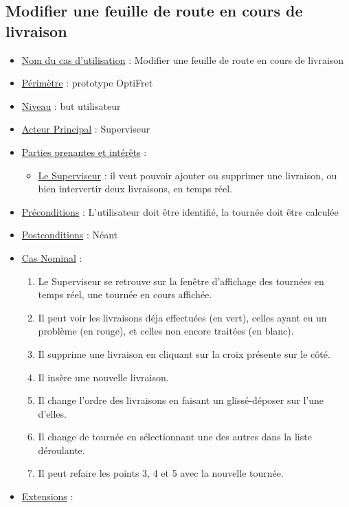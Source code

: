 \documentclass[a4paper]{report}
\begin{document}
\subsection{Modifier une feuille de route en cours de livraison}
\begin{itemize}[label = \textbullet, font = \color{orange}]
\item \underline{Nom du cas d'utilisation} : Modifier une feuille de route en cours de livraison
\item \underline{Périmètre} : prototype OptiFret
\item \underline{Niveau} : but utilisateur
\item \underline{Acteur Principal} : Superviseur
\item \underline{Parties prenantes et intérêts} : 
	\begin{itemize}[label = \textbullet, font = \color{blue}]
    \item \underline{Le Superviseur} : il veut pouvoir ajouter ou supprimer une livraison, ou bien intervertir deux livraisons, en temps réel.
    \end{itemize}
\item \underline{Préconditions} : L'utilisateur doit être identifié, la tournée doit être calculée
\item \underline{Postconditions} : Néant
\item \underline{Cas Nominal} :
	\begin{enumerate}
    	\item Le Superviseur se retrouve sur la fenêtre d'affichage des tournées en temps réel, une tournée en cours affichée.
        \item Il peut voir les livraisons déja effectuées (en vert), celles ayant eu un problème (en rouge), et celles non encore traitées (en blanc).
        \item Il supprime une livraison en cliquant sur la croix présente sur le côté.
        \item Il insère une nouvelle livraison.
        \item Il change l'ordre des livraisons en faisant un glissé-déposer sur l'une d'elles.
        \item Il change de tournée en sélectionnant une des autres dans la liste déroulante.
        \item Il peut refaire les points 3, 4 et 5 avec la nouvelle tournée.
    \end{enumerate}
\item \underline{Extensions} :
	\begin{enumerate}

\end{enumerate}
\end{itemize}
\end{document}
